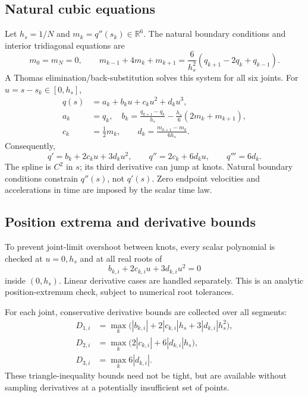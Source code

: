 \documentclass[11pt,a4paper]{report}
\newcommand{\R}{\mathbb{R}}
\begin{document}
\subsection{Natural cubic equations}
Let $h_s=1/N$ and $m_k=q''(s_k)\in\R^6$. The natural boundary conditions and
interior tridiagonal equations are
\begin{equation}
 m_0=m_N=0,\qquad
 m_{k-1}+4m_k+m_{k+1}
 =\frac{6}{h_s^2}(q_{k+1}-2q_k+q_{k-1}).
\end{equation}
A Thomas elimination/back-substitution solves this system for all six joints.
For $u=s-s_k\in[0,h_s]$,
\begin{align}
 q(s)&=a_k+b_ku+c_ku^2+d_ku^3,\\
 a_k&=q_k,\quad
 b_k=\frac{q_{k+1}-q_k}{h_s}-\frac{h_s}{6}(2m_k+m_{k+1}),\\
 c_k&=\tfrac12m_k,\qquad d_k=\frac{m_{k+1}-m_k}{6h_s}.
\end{align}
Consequently,
\begin{equation}
 q'=b_k+2c_ku+3d_ku^2,\qquad q''=2c_k+6d_ku,\qquad q'''=6d_k.
\end{equation}
The spline is $C^2$ in $s$; its third derivative can jump at knots. Natural
boundary conditions constrain $q''(s)$, not $q'(s)$. Zero endpoint velocities
and accelerations in time are imposed by the scalar time law.

\subsection{Position extrema and derivative bounds}
To prevent joint-limit overshoot between knots, every scalar polynomial is
checked at $u=0,h_s$ and at all real roots of
\begin{equation}
 b_{k,i}+2c_{k,i}u+3d_{k,i}u^2=0
\end{equation}
inside $(0,h_s)$. Linear derivative cases are handled separately. This is an
analytic position-extremum check, subject to numerical root tolerances.

For each joint, conservative derivative bounds are collected over all segments:
\begin{align}
 D_{1,i}&=\max_k\bigl(|b_{k,i}|+2|c_{k,i}|h_s+3|d_{k,i}|h_s^2\bigr),\\
 D_{2,i}&=\max_k\bigl(2|c_{k,i}|+6|d_{k,i}|h_s\bigr),\\
 D_{3,i}&=\max_k6|d_{k,i}|.
 \label{eq:derivativebounds}
\end{align}
These triangle-inequality bounds need not be tight, but are available without
sampling derivatives at a potentially insufficient set of points.
\end{document}

